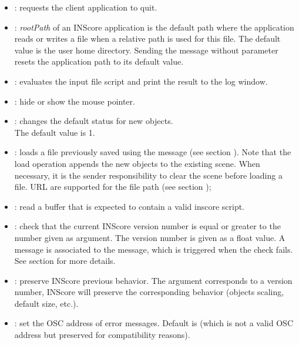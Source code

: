 \documentclass[a4paper,twoside]{report}
\begin{document}
\begin{itemize}
\item {}: requests the client application to quit.

\item {}: \emph{rootPath} of an INScore application is the default path where the application reads or writes a file when a relative path is used for this file. The default value is the user home directory. Sending the  message without parameter resets the application path to its default value.

\item {}: evaluates the input file script and print the result to the log window.

\item {}: hide or show the mouse pointer.

\item {}: changes the default  status for new objects. \\
The default  value is 1.

\item {}: loads a file previously saved using the  message (see section ). Note that the load operation appends the new objects to the existing scene. When necessary, it is the sender responsibility to clear the scene before loading a file. URL are supported for the file path (see section );

\item {}: read a buffer that is expected to contain a valid inscore script.

\item {}: check that the current INScore version number is equal or greater to the number given as argument. The version number is given as a float value. A message is associated to the  message, which is triggered when the check fails. See section  for more details.

\item {}: preserve INScore previous behavior. The argument corresponds to a version number, INScore will preserve the corresponding behavior (objects scaling, default size, etc.).

\item {}: set the OSC address of error messages. Default is  (which is not a valid OSC address but preserved for compatibility reasons).


\end{itemize}
\end{document}
